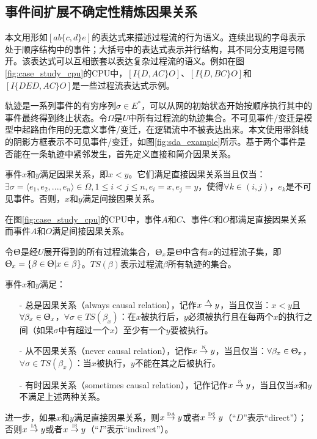 \subsection{事件间扩展不确定性精炼因果关系}\label{subsec:exroru_causal}
本文用形如$[ab\{c,d\}e]$的表达式来描述过程流的行为语义。连续出现的字母表示处于顺序结构中的事件；大括号中的表达式表示并行结构，其不同分支用逗号隔开。该表达式可以互相嵌套以表达复杂过程流的语义。例如在图\ref{fig:case_study_cpu}的CPU中，$[I\{D,AC\}O]$、$[I\{D,BC\}O]$和$[I\{DED,AC\}O]$是一些过程流表达式示例。

轨迹是一系列事件的有穷序列$\sigma\in E^{*}$，可以从网的初始状态开始按顺序执行其中的事件最终得到终止状态。令$\Omega$是$U$中所有过程流的轨迹集合。不可见事件/变迁是模型中起路由作用的无意义事件/变迁，在逻辑流中不被表达出来\cite{wen2007mining}。本文使用带斜线的阴影方框表示不可见事件/变迁，如图\ref{fig:sda_example}所示。基于两个事件是否能在一条轨迹中紧邻发生，首先定义直接和简介因果关系。

\begin{definition}[直接和间接因果关系]\label{def:d_i_causal_relation}
事件$x$和$y$满足因果关系，即$x<y$。它们满足直接因果关系当且仅当：$\exists\sigma=\langle e_{1},e_{2},...,e_{n}\rangle\in\Omega,1\leq i<j\leq n,e_{i}=x,e_{j}=y$，使得$\forall k\in(i,j)$，$e_{k}$是不可见事件。否则，$x$和$y$满足间接因果关系。
\end{definition}

\begin{example}\label{ex:sda}
在图\ref{fig:case_study_cpu}的CPU中，事件$A$和$C$、事件$C$和$O$都满足直接因果关系而事件$A$和$O$满足间接因果关系。
\end{example}

令$\Uptheta$是经$U$展开得到的所有过程流集合，$\Uptheta_{x}$是$\Uptheta$中含有$x$的过程流子集，即$\Uptheta_{x}=\{\beta\in\Uptheta|x\in\beta\}$。$TS(\beta)$表示过程流$\beta$所有轨迹的集合。

\begin{definition}[事件间扩展不确定性精炼因果关系]\label{def:exroru_causal}
事件$x$和$y$满足：
  \begin{itemize}
  	\item[-] 总是因果关系（always causal relation），记作$x\overset{\text{\tiny{A}}}{\rightarrow}y$，当且仅当：$x<y$且$\forall\beta_{x}\in\Uptheta_{x}$，$\forall\sigma\in TS(\beta_{x})$：在$x$被执行后，$y$必须被执行且在每两个$x$的执行之间（如果$\sigma$中有超过一个$x$）至少有一个$y$要被执行。
  	\item[-] 从不因果关系（never causal relation），记作$x\overset{\text{\tiny{N}}}{\rightarrow}y$，当且仅当：$\forall\beta_{x}\in\Uptheta_{x}$，$\forall\sigma\in TS(\beta_{x})$：当$x$被执行，$y$不能在其之后被执行。
  	\item[-] 有时因果关系（sometimes causal relation），记作记作$x\overset{\text{\tiny{S}}}{\rightarrow}y$，当且仅当$x$和$y$不满足上述两种关系。
  \end{itemize}
进一步，如果$x$和$y$满足直接因果关系，则$x\overset{\text{\tiny{DA}}}{\rightarrow}y$或者$x\overset{\text{\tiny{DS}}}{\rightarrow}y$（“$D$”表示“direct”）；否则$x\overset{\text{\tiny{IA}}}{\rightarrow}y$或者$x\overset{\text{\tiny{IS}}}{\rightarrow}y$（“$I$”表示“indirect”）。
\end{definition}

